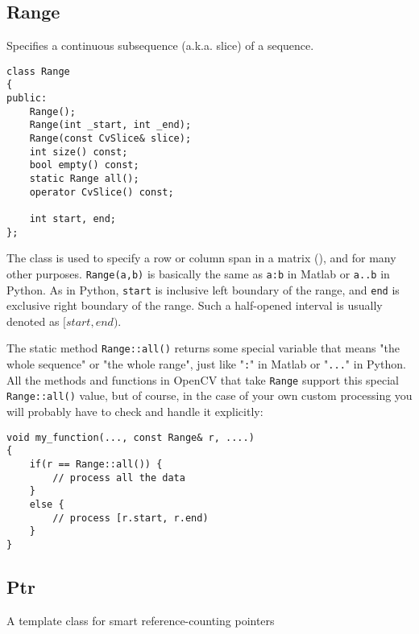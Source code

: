 \subsection{Range}\label{Range}
Specifies a continuous subsequence (a.k.a. slice) of a sequence.

\begin{lstlisting}
class Range
{
public:
    Range();
    Range(int _start, int _end);
    Range(const CvSlice& slice);
    int size() const;
    bool empty() const;
    static Range all();
    operator CvSlice() const;

    int start, end;
};
\end{lstlisting}

The class is used to specify a row or column span in a matrix (), and for many other purposes. \texttt{Range(a,b)} is basically the same as \texttt{a:b} in Matlab or \texttt{a..b} in Python. As in Python, \texttt{start} is inclusive left boundary of the range, and \texttt{end} is exclusive right boundary of the range. Such a half-opened interval is usually denoted as $[start,end)$.

The static method \texttt{Range::all()} returns some special variable that means "the whole sequence" or "the whole range", just like "\texttt{:}" in Matlab or "\texttt{...}" in Python. All the methods and functions in OpenCV that take \texttt{Range} support this special \texttt{Range::all()} value, but of course, in the case of your own custom processing you will probably have to check and handle it explicitly:
\begin{lstlisting}
void my_function(..., const Range& r, ....)
{
    if(r == Range::all()) {
        // process all the data
    }
    else {
        // process [r.start, r.end)
    } 
}
\end{lstlisting}

\subsection{Ptr}\label{Ptr}

A template class for smart reference-counting pointers

